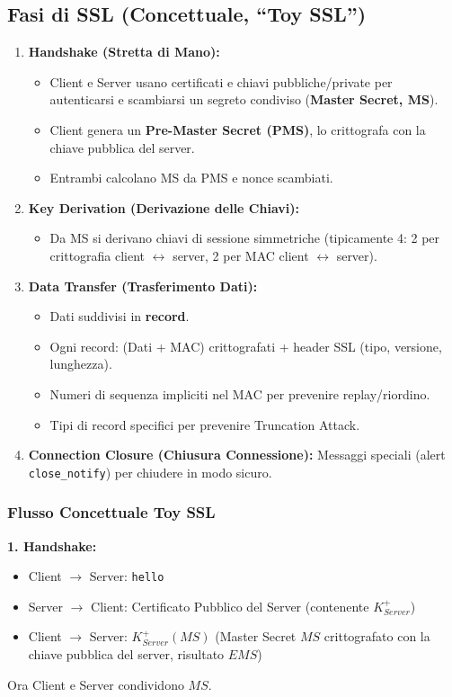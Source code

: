 \subsection{Fasi di SSL (Concettuale, \textquotedblleft Toy SSL\textquotedblright{})}
\begin{enumerate}
    \item \textbf{Handshake (Stretta di Mano):}
    \begin{itemize}
        \item Client e Server usano certificati e chiavi pubbliche/private per autenticarsi e scambiarsi un segreto condiviso (\textbf{Master Secret, MS}).
        \item Client genera un \textbf{Pre-Master Secret (PMS)}, lo crittografa con la chiave pubblica del server.
        \item Entrambi calcolano MS da PMS e nonce scambiati.
    \end{itemize}
    \item \textbf{Key Derivation (Derivazione delle Chiavi):}
    \begin{itemize}
        \item Da MS si derivano chiavi di sessione simmetriche (tipicamente 4: 2 per crittografia client $\leftrightarrow$ server, 2 per MAC client $\leftrightarrow$ server).
    \end{itemize}
    \item \textbf{Data Transfer (Trasferimento Dati):}
    \begin{itemize}
        \item Dati suddivisi in \textbf{record}.
        \item Ogni record: (Dati + MAC) crittografati + header SSL (tipo, versione, lunghezza).
        \item Numeri di sequenza impliciti nel MAC per prevenire replay/riordino.
        \item Tipi di record specifici per prevenire Truncation Attack.
    \end{itemize}
    \item \textbf{Connection Closure (Chiusura Connessione):}
    Messaggi speciali (alert \texttt{close\_notify}) per chiudere in modo sicuro.
\end{enumerate}

\subsubsection{Flusso Concettuale Toy SSL}
\label{ssubsec:toy_ssl_flow}
\textbf{1. Handshake:}
\begin{itemize}
    \item Client $\rightarrow$ Server: \texttt{hello}
    \item Server $\rightarrow$ Client: Certificato Pubblico del Server (contenente $K_{Server}^+$)
    \item Client $\rightarrow$ Server: $K_{Server}^+(MS)$ (Master Secret $MS$ crittografato con la chiave pubblica del server, risultato $EMS$)
\end{itemize}
Ora Client e Server condividono $MS$.


